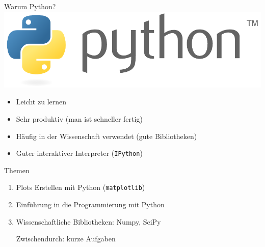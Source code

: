 \begin{frame}{Warum Python?}
  \includegraphics[width=\textwidth]{logos/python.pdf}
  \begin{itemize}
    \item Leicht zu lernen
    \item Sehr produktiv (man ist schneller fertig)
    \item Häufig in der Wissenschaft verwendet (gute Bibliotheken)
    \item Guter interaktiver Interpreter (\texttt{IPython})
  \end{itemize}
\end{frame}

\begin{frame}{Themen}
  \linespread{2}
  \begin{enumerate}
    \item {\large Plots Erstellen mit Python (\texttt{matplotlib})}
    \item {\large Einführung in die Programmierung mit Python}
    \item {\large Wissenschaftliche Bibliotheken: Numpy, SciPy}

    \Large Zwischendurch: kurze Aufgaben
  \end{enumerate}
\end{frame}

